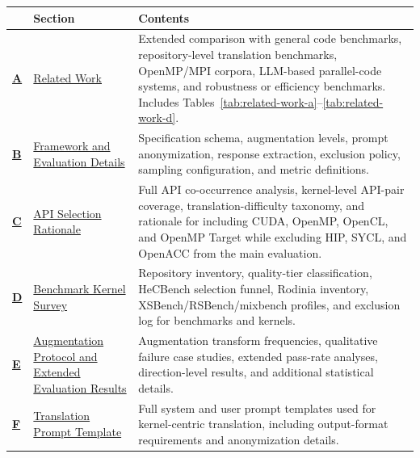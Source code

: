 \begin{center}
\small
\renewcommand{\arraystretch}{1.15}
\setlength{\tabcolsep}{5pt}

\newlength{\appendixsectionwidth}
\settowidth{\appendixsectionwidth}{Supplementary Tables and Figures\quad}

\begin{tabularx}{0.98\textwidth}{@{}
>{\bfseries}p{}
>{\RaggedRight\arraybackslash}p{\appendixsectionwidth}
X
@{}}
\toprule
\textbf{} & \textbf{Section} & \textbf{Contents} \\
\midrule

\hyperref[sec:appendix-d]{A}
& \hyperref[sec:appendix-d]{Related Work}
& Extended comparison with general code benchmarks, repository-level translation benchmarks,
OpenMP/MPI corpora, LLM-based parallel-code systems, and robustness or efficiency benchmarks.
Includes Tables~\ref{tab:related-work-a}--\ref{tab:related-work-d}. \\

\hyperref[sec:appendix-a]{B}
& \hyperref[sec:appendix-a]{Framework and Evaluation Details}
& Specification schema, augmentation levels, prompt anonymization, response extraction,
\knownfail{} exclusion policy, sampling configuration, and metric definitions. \\

\hyperref[sec:appendix-b]{C}
& \hyperref[sec:appendix-b]{API Selection Rationale}
& Full API co-occurrence analysis, kernel-level API-pair coverage, translation-difficulty taxonomy,
and rationale for including CUDA, OpenMP, OpenCL, and OpenMP Target while excluding HIP,
SYCL, and OpenACC from the main evaluation. \\

\hyperref[sec:appendix-c]{D}
& \hyperref[sec:appendix-c]{Benchmark Kernel Survey}
& Repository inventory, quality-tier classification, HeCBench selection funnel, Rodinia inventory,
XSBench/RSBench/mixbench profiles, and exclusion log for benchmarks and kernels. \\

\hyperref[sec:appendix-e]{E}
& \hyperref[sec:appendix-e]{Augmentation Protocol and Extended Evaluation Results}
& Augmentation transform frequencies, qualitative failure case studies, extended pass-rate analyses,
direction-level results, and additional statistical details. \\

\hyperref[sec:appendix-g]{F}
& \hyperref[sec:appendix-g]{Translation Prompt Template}
& Full system and user prompt templates used for kernel-centric translation, including output-format
requirements and anonymization details. \\


\end{tabularx}
\end{center}
